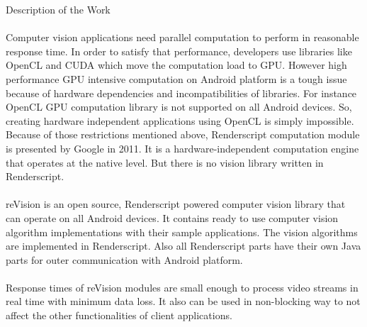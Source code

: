 \documentclass[12pt, a4paper]{article} \pagenumbering{gobble}
\begin{document}
\begin{section}{Description of the Work}
\paragraph{}{%
  Computer vision applications need parallel computation to perform in reasonable response time.
  In order to satisfy that performance, developers use libraries like OpenCL and CUDA which move the computation
  load to GPU. However high performance GPU intensive computation on Android platform is a tough issue because
  of hardware dependencies and incompatibilities of libraries. For instance OpenCL GPU computation library is not
  supported on all Android devices. So, creating hardware independent applications using OpenCL is simply impossible.
  Because of those restrictions mentioned above, Renderscript computation module is presented by Google in 2011.
  It is ﻿a hardware-independent computation engine that operates at the native level. But there is no vision library
  written in Renderscript.
}
\paragraph{}{%
  reVision is an open source, Renderscript powered computer vision library that can operate on all Android devices.
  It contains ready to use computer vision algorithm implementations with their sample applications. The vision
  algorithms are implemented in Renderscript. Also all Renderscript parts have their own Java parts for outer
  communication with Android platform.
}
\paragraph{}{Response times of reVision modules are small enough to process video streams in real time with minimum data loss. It also can be used in non-blocking way to not affect the other functionalities of client applications.}
\end{section}

\newpage
\end{document}
